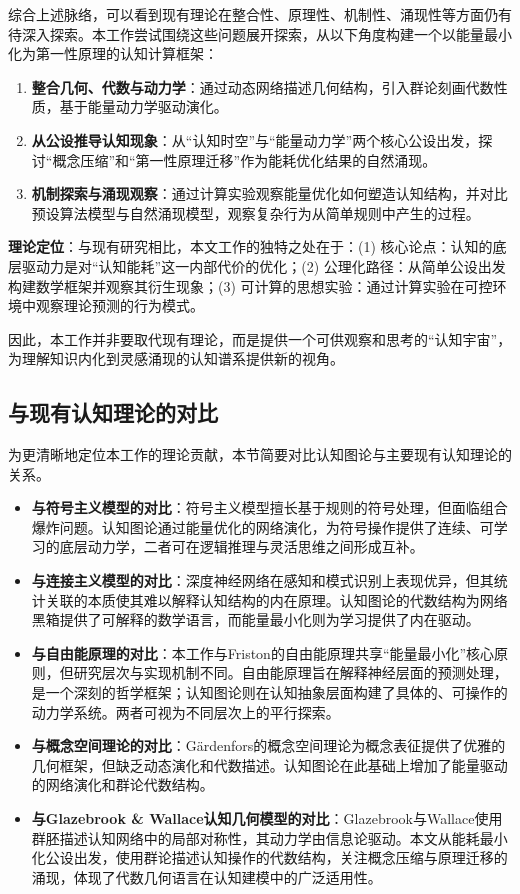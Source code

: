 \documentclass[12pt,a4paper]{article}
\begin{document}
综合上述脉络，可以看到现有理论在整合性、原理性、机制性、涌现性等方面仍有待深入探索。本工作尝试围绕这些问题展开探索，从以下角度构建一个以能量最小化为第一性原理的认知计算框架：
\begin{enumerate}
\item \textbf{整合几何、代数与动力学}：通过动态网络描述几何结构，引入群论刻画代数性质，基于能量动力学驱动演化。
\item \textbf{从公设推导认知现象}：从“认知时空”与“能量动力学”两个核心公设出发，探讨“概念压缩”和“第一性原理迁移”作为能耗优化结果的自然涌现。
\item \textbf{机制探索与涌现观察}：通过计算实验观察能量优化如何塑造认知结构，并对比预设算法模型与自然涌现模型，观察复杂行为从简单规则中产生的过程。
\end{enumerate}

\textbf{理论定位}：与现有研究相比，本文工作的独特之处在于：(1) 核心论点：认知的底层驱动力是对“认知能耗”这一内部代价的优化；(2) 公理化路径：从简单公设出发构建数学框架并观察其衍生现象；(3) 可计算的思想实验：通过计算实验在可控环境中观察理论预测的行为模式。

因此，本工作并非要取代现有理论，而是提供一个可供观察和思考的“认知宇宙”，为理解知识内化到灵感涌现的认知谱系提供新的视角。

\subsection{与现有认知理论的对比}
\label{subsec:comparison_with_existing}

为更清晰地定位本工作的理论贡献，本节简要对比认知图论与主要现有认知理论的关系。

\begin{itemize}
\item \textbf{与符号主义模型的对比}：符号主义模型擅长基于规则的符号处理，但面临组合爆炸问题。认知图论通过能量优化的网络演化，为符号操作提供了连续、可学习的底层动力学，二者可在逻辑推理与灵活思维之间形成互补。
\item \textbf{与连接主义模型的对比}：深度神经网络在感知和模式识别上表现优异，但其统计关联的本质使其难以解释认知结构的内在原理。认知图论的代数结构为网络黑箱提供了可解释的数学语言，而能量最小化则为学习提供了内在驱动。
\item \textbf{与自由能原理的对比}：本工作与Friston的自由能原理共享“能量最小化”核心原则，但研究层次与实现机制不同。自由能原理旨在解释神经层面的预测处理，是一个深刻的哲学框架；认知图论则在认知抽象层面构建了具体的、可操作的动力学系统。两者可视为不同层次上的平行探索。
\item \textbf{与概念空间理论的对比}：Gärdenfors的概念空间理论为概念表征提供了优雅的几何框架，但缺乏动态演化和代数描述。认知图论在此基础上增加了能量驱动的网络演化和群论代数结构。
\item \textbf{与Glazebrook \& Wallace认知几何模型的对比}：Glazebrook与Wallace使用群胚描述认知网络中的局部对称性，其动力学由信息论驱动。本文从能耗最小化公设出发，使用群论描述认知操作的代数结构，关注概念压缩与原理迁移的涌现，体现了代数几何语言在认知建模中的广泛适用性。
\end{itemize}
\end{document}
